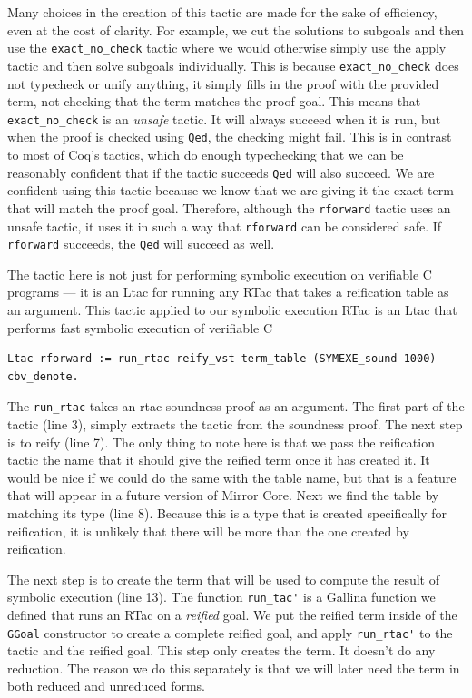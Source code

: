 \documentclass{puthesis}
\begin{document}
Many choices in the creation of this tactic are made for the sake of
efficiency, even at the cost of clarity. For example, we cut the
solutions to subgoals and then use the
\lstinline|exact_no_check| tactic where we would otherwise simply use the apply
tactic and then solve subgoals individually. This is because
\lstinline|exact_no_check| does not typecheck or unify anything, it simply
fills in the proof with the provided term, not checking that the term
matches the proof goal. This means that \lstinline|exact_no_check| is
an \emph{unsafe} tactic. It will always succeed when it is run, but
when the proof is checked using \lstinline|Qed|, the checking might
fail. This is in contrast to most of Coq's tactics, which do enough
typechecking that we can be reasonably confident that if the tactic
succeeds \lstinline|Qed| will also succeed. We are confident using
this tactic because we know that we are giving it the exact term that
will match the proof goal. Therefore, although the \lstinline|rforward| tactic uses an unsafe
tactic, it uses it in such a way that \lstinline|rforward| can be
considered safe. If \lstinline|rforward| succeeds, the \lstinline|Qed| will succeed as
well.

The tactic here is not just for performing symbolic execution on verifiable
C programs --- it is an Ltac for running any RTac that takes a
reification table as an argument. This tactic applied to our symbolic
execution RTac is an Ltac that performs fast symbolic execution of
verifiable C

\begin{lstlisting}
Ltac rforward := run_rtac reify_vst term_table (SYMEXE_sound 1000) cbv_denote.
\end{lstlisting}

The \lstinline|run_rtac| takes an rtac soundness proof as an
argument. The first part of the tactic (line 3), simply
extracts the tactic from the soundness proof. The next step is to
reify (line 7). The only thing to note here is that we pass the reification
tactic the name that it should give the reified term once it has
created it. It would be nice if we could do the same with the table
name, but that is a feature that will appear in a future version of
Mirror Core. Next we find the table by matching its type (line 8). Because this
is a type that is created specifically for reification, it is
unlikely that there will be more than the one created by reification. 

The next step is to create the term that will be used to compute the
result of symbolic execution (line 13). The function \lstinline|run_tac'| is a
Gallina function we defined that runs an RTac on a \emph{reified} goal. We put
the reified term inside of the \lstinline|GGoal| constructor to create
a complete reified goal, and apply \lstinline|run_rtac'| to the tactic
and the reified goal.  This step only creates the term. It doesn't do
any reduction. The reason we do this separately is that we will later
need the term in both reduced and unreduced forms. 
\end{document}
